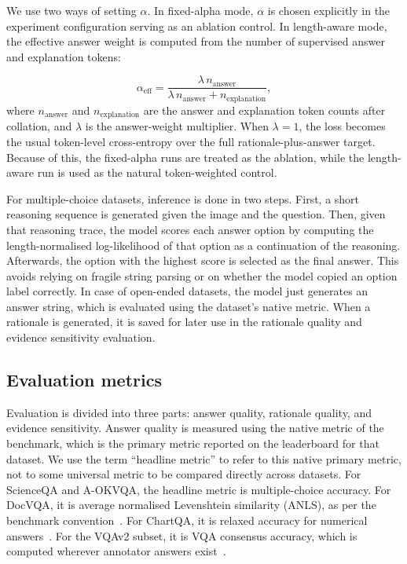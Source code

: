 \documentclass[preprint,12pt]{elsarticle}
\begin{document}
We use two ways of setting $\alpha$.
In fixed-alpha mode, $\alpha$ is chosen explicitly in the experiment configuration serving as an ablation control.
In length-aware mode, the effective answer weight is computed from the number of supervised answer and explanation tokens:

\begin{equation}
    \alpha_{\text{eff}} =
    \frac{\lambda\,n_{\text{answer}}}{\lambda\,n_{\text{answer}} + n_{\text{explanation}}},
    \label{Eq:LengthAlpha}
\end{equation}
where $n_{\text{answer}}$ and $n_{\text{explanation}}$ are the answer and explanation token counts after collation, and $\lambda$ is the answer-weight multiplier.
When $\lambda=1$, the loss becomes the usual token-level cross-entropy over the full rationale-plus-answer target.
Because of this, the fixed-alpha runs are treated as the ablation, while the length-aware run is used as the natural token-weighted control.

For multiple-choice datasets, inference is done in two steps.
First, a short reasoning sequence is generated given the image and the question.
Then, given that reasoning trace, the model scores each answer option by computing the length-normalised log-likelihood of that option as a continuation of the reasoning.
Afterwards, the option with the highest score is selected as the final answer.
This avoids relying on fragile string parsing or on whether the model copied an option label correctly.
In case of open-ended datasets, the model just generates an answer string, which is evaluated using the dataset's native metric.
When a rationale is generated, it is saved for later use in the rationale quality and evidence sensitivity evaluation.

\subsection{Evaluation metrics}
Evaluation is divided into three parts: answer quality, rationale quality, and evidence sensitivity.
Answer quality is measured using the native metric of the benchmark, which is the primary metric reported on the leaderboard for that dataset.
We use the term ``headline metric'' to refer to this native primary metric,
not to some universal metric to be compared directly across datasets.
For ScienceQA and A-OKVQA, the headline metric is multiple-choice accuracy.
For DocVQA, it is average normalised Levenshtein similarity (ANLS), as per the benchmark convention~\cite{mathew2021docvqa}.
For ChartQA, it is relaxed accuracy for numerical answers~\cite{masry2022chartqa}.
For the VQAv2 subset, it is VQA consensus accuracy, which is computed wherever annotator answers exist~\cite{antol2015vqa,goyal2017vqav2}.
\end{document}
